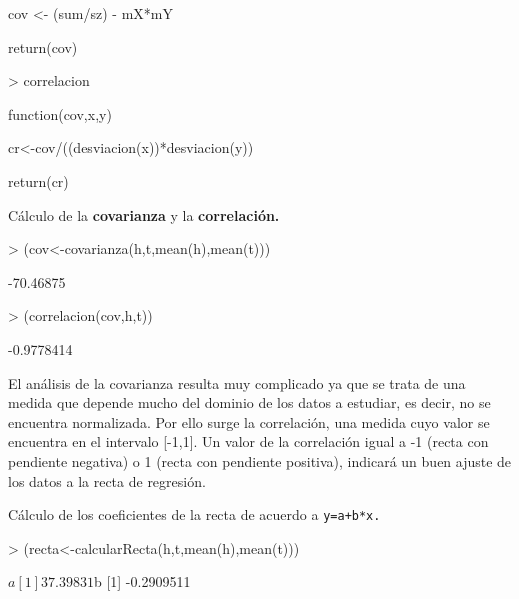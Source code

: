 \documentclass [a4paper] {article}
\begin{document}
\begin{Schunk}
\begin{Soutput}
{    cov <- (sum/sz) - mX*mY

    return(cov)
}
\end{Soutput}
\begin{Sinput}
> correlacion
\end{Sinput}
\begin{Soutput}
function(cov,x,y){
    cr<-cov/((desviacion(x))*desviacion(y))

    return(cr)
}
\end{Soutput}
\end{Schunk}

\bigskip
Cálculo de la \textbf{covarianza} y la \textbf{correlación.}
\begin{Schunk}
\begin{Sinput}
> (cov<-covarianza(h,t,mean(h),mean(t)))
\end{Sinput}
\begin{Soutput}
[1] -70.46875
\end{Soutput}
\begin{Sinput}
> (correlacion(cov,h,t))
\end{Sinput}
\begin{Soutput}
[1] -0.9778414
\end{Soutput}
\end{Schunk}

\bigskip
El análisis de la covarianza resulta muy complicado ya que se trata de una medida que depende mucho del dominio de los datos
a estudiar, es decir, no se encuentra normalizada. Por ello surge la correlación, una medida cuyo valor se encuentra en el
intervalo [-1,1]. Un valor de la correlación igual a -1 (recta con pendiente negativa) o 1 (recta con pendiente positiva), indicará
un buen ajuste de los datos a la recta de regresión.

\bigskip
Cálculo de los coeficientes de la recta de acuerdo a \texttt{y=a+b*x.}
\begin{Schunk}
\begin{Sinput}
> (recta<-calcularRecta(h,t,mean(h),mean(t)))
\end{Sinput}
\begin{Soutput}
$a
[1] 37.39831

$b
[1] -0.2909511
\end{Soutput}
\end{Schunk}
\end{document}
